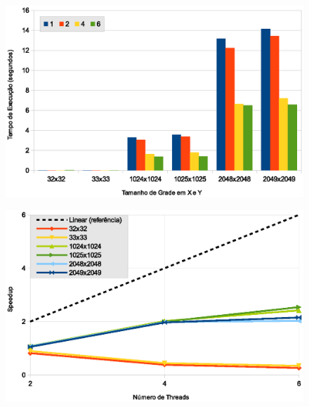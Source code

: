 \begin{figure}[H]
    \centering
    \begin{minipage}{.5\textwidth}
        \includegraphics[width=\textwidth]{figures/exectime-v1}
        \label{subfig:exectime-v1}
    \end{minipage}%
    \begin{minipage}{.5\textwidth}
        \includegraphics[width=\textwidth]{figures/speedup-v1}
        \label{subfig:speedup-v1}
    \end{minipage}


\end{figure}
